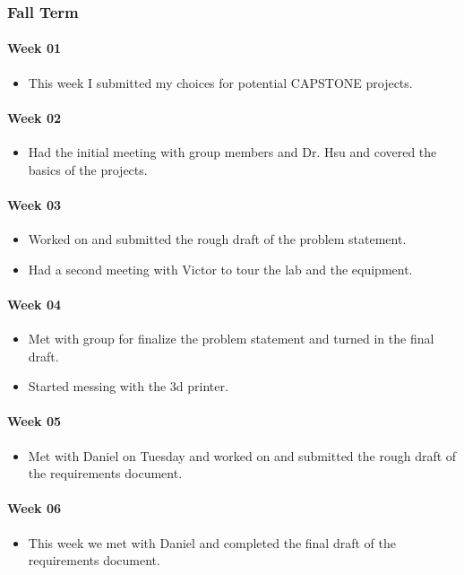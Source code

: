 \subsubsection{Fall Term}
\paragraph{Week 01}
\begin{itemize}
\item This week I submitted my choices for potential CAPSTONE projects. 
\end{itemize}
\paragraph{Week 02}
\begin{itemize}
\item Had the initial meeting with group members and Dr. Hsu and covered the basics of the projects. 
\end{itemize}
\paragraph{Week 03}
\begin{itemize}
\item Worked on and submitted the rough draft of the problem statement. 
\item Had a second meeting with Victor to tour the lab and the equipment.  
\end{itemize}
\paragraph{Week 04}
\begin{itemize}
\item Met with group for finalize the problem statement and turned in the final draft. 
\item Started messing with the 3d printer. 
\end{itemize}
\paragraph{Week 05}
\begin{itemize}
\item Met with Daniel on Tuesday and worked on and submitted the rough draft of the requirements document. 
\end{itemize}
\paragraph{Week 06}
\begin{itemize}
\item This week we met with Daniel and completed the final draft of the requirements document. 
\end{itemize}
